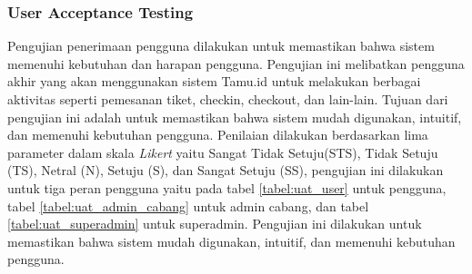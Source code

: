 



\subsubsection{User Acceptance Testing}

Pengujian penerimaan pengguna dilakukan untuk memastikan bahwa sistem memenuhi kebutuhan dan harapan pengguna. Pengujian ini melibatkan pengguna akhir yang akan menggunakan sistem Tamu.id untuk melakukan berbagai aktivitas seperti pemesanan tiket, checkin, checkout, dan lain-lain. Tujuan dari pengujian ini adalah untuk memastikan bahwa sistem mudah digunakan, intuitif, dan memenuhi kebutuhan pengguna. Penilaian dilakukan berdasarkan  lima parameter dalam skala \textit{Likert} yaitu Sangat Tidak Setuju(STS), Tidak Setuju (TS), Netral (N), Setuju (S), dan Sangat Setuju (SS), pengujian ini dilakukan untuk tiga peran pengguna yaitu pada tabel \ref{tabel:uat_user} untuk pengguna, tabel \ref{tabel:uat_admin_cabang} untuk admin cabang, dan tabel \ref{tabel:uat_superadmin} untuk superadmin. Pengujian ini dilakukan untuk memastikan bahwa sistem mudah digunakan, intuitif, dan memenuhi kebutuhan pengguna.

